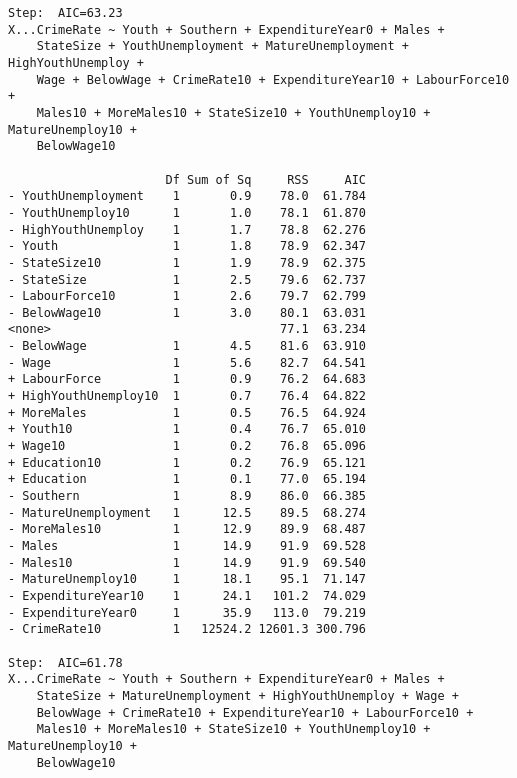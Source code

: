 \documentclass[11pt]{article}
\begin{document}
\begin{enumerate}
\begin{verbatim}
Step:  AIC=63.23
X...CrimeRate ~ Youth + Southern + ExpenditureYear0 + Males + 
    StateSize + YouthUnemployment + MatureUnemployment + HighYouthUnemploy + 
    Wage + BelowWage + CrimeRate10 + ExpenditureYear10 + LabourForce10 + 
    Males10 + MoreMales10 + StateSize10 + YouthUnemploy10 + MatureUnemploy10 + 
    BelowWage10

                      Df Sum of Sq     RSS     AIC
- YouthUnemployment    1       0.9    78.0  61.784
- YouthUnemploy10      1       1.0    78.1  61.870
- HighYouthUnemploy    1       1.7    78.8  62.276
- Youth                1       1.8    78.9  62.347
- StateSize10          1       1.9    78.9  62.375
- StateSize            1       2.5    79.6  62.737
- LabourForce10        1       2.6    79.7  62.799
- BelowWage10          1       3.0    80.1  63.031
<none>                                77.1  63.234
- BelowWage            1       4.5    81.6  63.910
- Wage                 1       5.6    82.7  64.541
+ LabourForce          1       0.9    76.2  64.683
+ HighYouthUnemploy10  1       0.7    76.4  64.822
+ MoreMales            1       0.5    76.5  64.924
+ Youth10              1       0.4    76.7  65.010
+ Wage10               1       0.2    76.8  65.096
+ Education10          1       0.2    76.9  65.121
+ Education            1       0.1    77.0  65.194
- Southern             1       8.9    86.0  66.385
- MatureUnemployment   1      12.5    89.5  68.274
- MoreMales10          1      12.9    89.9  68.487
- Males                1      14.9    91.9  69.528
- Males10              1      14.9    91.9  69.540
- MatureUnemploy10     1      18.1    95.1  71.147
- ExpenditureYear10    1      24.1   101.2  74.029
- ExpenditureYear0     1      35.9   113.0  79.219
- CrimeRate10          1   12524.2 12601.3 300.796

Step:  AIC=61.78
X...CrimeRate ~ Youth + Southern + ExpenditureYear0 + Males + 
    StateSize + MatureUnemployment + HighYouthUnemploy + Wage + 
    BelowWage + CrimeRate10 + ExpenditureYear10 + LabourForce10 + 
    Males10 + MoreMales10 + StateSize10 + YouthUnemploy10 + MatureUnemploy10 + 
    BelowWage10


\end{verbatim}
\end{enumerate}
\end{document}
